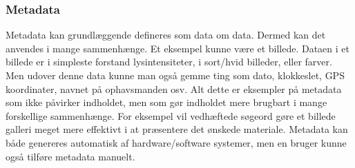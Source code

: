 \subsubsection{Metadata}
Metadata kan grundlæggende defineres som data om data. Dermed kan det anvendes i mange sammenhænge. Et eksempel kunne være et billede. Dataen i et billede er i simpleste forstand lysintensiteter, i sort/hvid billeder, eller farver. Men udover denne data kunne man også gemme ting som dato, klokkeslet, GPS koordinater, navnet på ophavsmanden osv. Alt dette er eksempler på metadata som ikke påvirker indholdet, men som gør indholdet mere brugbart i mange forskellige sammenhænge. For eksempel vil vedhæftede søgeord gøre et billede galleri meget mere effektivt i at præsentere det ønskede materiale. Metadata kan både genereres automatisk af hardware/software systemer, men en bruger kunne også tilføre metadata manuelt.

